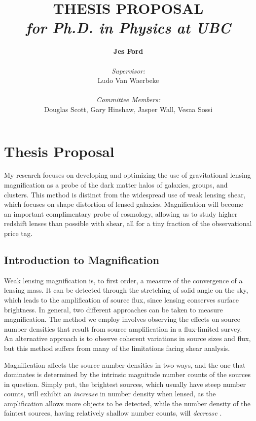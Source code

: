 \documentclass{article}
\begin{document}
\title{\textbf{THESIS PROPOSAL} \\ \small{\it for Ph.D. in Physics at UBC}}
\author{\Large{\textbf{Jes Ford}} \\ \\ {\it Supervisor:} \\ Ludo Van Waerbeke \\ \\ {\it Committee Members:} \\ Douglas Scott, Gary Hinshaw, Jasper Wall, Vesna Sossi}
\maketitle


\setcounter{section}{0}
\setcounter{subsection}{0}


\section{Thesis Proposal}
My research focuses on developing and optimizing the use of gravitational lensing magnification as a probe of the dark matter halos of galaxies, groups, and clusters. This method is distinct from the widespread use of weak lensing shear, which focuses on shape distortion of lensed galaxies. Magnification will become an important complimentary probe of cosmology, allowing us to study higher redshift lenses than possible with shear, all for a tiny fraction of the observational price tag.

\subsection{Introduction to Magnification}
Weak lensing magnification is, to first order, a measure of the convergence of a lensing mass.  It can be detected through the stretching of solid angle on the sky, which leads to the amplification of source flux, since lensing conserves surface brightness. In general, two different approaches can be taken to measure magnification.  The method we employ involves observing the effects on source number densities that result from source amplification in a flux-limited survey. An alternative approach is to observe coherent variations in source sizes and flux, but this method suffers from many of the limitations facing shear analysis.

Magnification affects the source number densities in two ways, and the one that dominates is determined by the intrinsic magnitude number counts of the sources in question.  Simply put, the brightest sources, which usually have steep number counts, will exhibit an {\it increase} in number density when lensed, as the amplification allows more objects to be detected, while the number density of the faintest sources, having relatively shallow number counts, will {\it decrease} \citep{Narayan89}.
\end{document}
